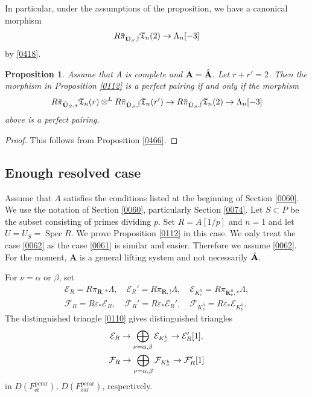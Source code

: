 \documentclass{amsart}
\newtheorem{Prop}[Thm]{Proposition}
\theoremstyle{remark}
\numberwithin{equation}{subsection}
\newcommand{\tensor}{\mathbin{\otimes}}
\newcommand{\et}{\mathrm{et}}
\newcommand{\zar}{\mathrm{zar}}
\newcommand{\perar}{\mathrm{perar}}
\newcommand{\alg}[1]{\mathbf{#1}}
\DeclareMathOperator{\Spec}{Spec}
\begin{document}
In particular, under the assumptions of the proposition, we have a canonical morphism
	\[
			R \Bar{\pi}_{\Hat{\alg{U}}_{S}, \Hat{!}} \mathfrak{T}_{n}(2)
		\to
			\Lambda_{n}[-3]
	\]
by \eqref{0418}.

\begin{Prop} \label{0471}
	Assume that $A$ is complete and $\alg{A} = \Hat{\alg{A}}$.
	Let $r + r' = 2$.
	Then the morphism in Proposition \ref{0112} is a perfect pairing
	if and only if the morphism
		\[
					R \Bar{\pi}_{\Hat{\alg{U}}_{S}, \ast} \mathfrak{T}_{n}(r)
				\tensor^{L}
					R \Bar{\pi}_{\Hat{\alg{U}}_{S}, \Hat{!}} \mathfrak{T}_{n}(r')
			\to
				R \Bar{\pi}_{\Hat{\alg{U}}_{S}, \Hat{!}} \mathfrak{T}_{n}(2)
			\to
				\Lambda_{n}[-3]
		\]
	above is a perfect pairing.
\end{Prop}

\begin{proof}
	This follows from Proposition \ref{0466}.
\end{proof}


\subsection{Enough resolved case}
\label{0113}

Assume that $A$ satisfies the conditions listed at the beginning of
Section \ref{0060}.
We use the notation of Section \ref{0060},
particularly Section \ref{0074}.
Let $S \subset P$ be the subset consisting of primes dividing $p$.
Set $R = A[1 / p]$ and $n = 1$ and let $U = U_{S} = \Spec R$.
We prove Proposition \ref{0112}
in this case.
We only treat the case \eqref{0062}
as the case \eqref{0061} is similar and easier.
Therefore we assume \eqref{0062}.
For the moment, $\alg{A}$ is a general lifting system and not necessarily $\Hat{\alg{A}}$.

For $\nu = \alpha$ or $\beta$, set
	\begin{gather*}
				\mathcal{E}_{R}
			=
				R \pi_{\alg{R}, \ast} \Lambda,
			\quad
				\mathcal{E}_{R}'
			=
				R \pi_{\alg{R}, !} \Lambda,
			\quad
				\mathcal{E}_{K_{\nu}^{h}}
			=
				R \pi_{\alg{K}_{\nu}^{h}, \ast} \Lambda,
		\\
				\mathcal{F}_{R}
			=
				R \varepsilon_{\ast} \mathcal{E}_{R},
			\quad
				\mathcal{F}_{R}'
			=
				R \varepsilon_{\ast} \mathcal{E}_{R}',
			\quad
				\mathcal{F}_{K_{\nu}^{h}}
			=
				R \varepsilon_{\ast} \mathcal{E}_{K_{\nu}^{h}}.
	\end{gather*}
The distinguished triangle \eqref{0110} gives distinguished triangles
\begin{gather}
		\notag
				\mathcal{E}_{R}
			\to
				\bigoplus_{\nu = \alpha, \beta}
					\mathcal{E}_{K_{\nu}^{h}}
			\to
				\mathcal{E}_{R}'[1],
		\\ \label{0456}
				\mathcal{F}_{R}
			\to
				\bigoplus_{\nu = \alpha, \beta}
					\mathcal{F}_{K_{\nu}^{h}}
			\to
				\mathcal{F}_{R}'[1]
	\end{gather}
in $D(F^{\perar}_{\et})$, $D(F^{\perar}_{\zar})$, respectively.
\end{document}
